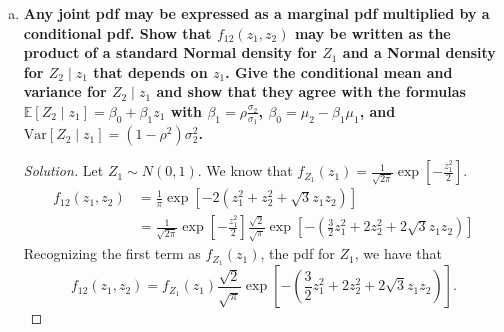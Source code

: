 \documentclass[11pt]{article}
\newenvironment{solution}
  {\renewcommand\qedsymbol{$\blacksquare$}\begin{proof}[Solution]}
  {\end{proof}}
\begin{document}
\begin{enumerate}
\begin{enumerate}[a)]
      \begin{solution}
        Note that 
        \begin{align*}
          f_{12}(z_1, z_2) &= \exp \left[ -\log (\pi ) - 2(z_1^2 + z_2^2 + \sqrt{3}z_1 z_2) \right] \\
          &= \frac{1}{\pi} \exp \left[ - 2(z_1^2 + z_2^2 + \sqrt{3}z_1 z_2) \right].
        \end{align*}

        Rewriting this expression, we have that 
        \begin{align*}
          f_{12}(z_1, z_2) &= \frac{1}{\pi} \exp \left[ - 2(z_1^2 + z_2^2 + \sqrt{3}z_1 z_2) \right] \\
          &= \frac{1}{2\pi \left( \frac{1}{2} \right)}  \exp \left[ -\frac{1}{2\left( \frac{1}{4} \right) }(z_1^2 + z_2^2 - 2\left( -\frac{\sqrt{3}}{2} \right) z_1 z_2) \right].
        \end{align*}

        We recognize this as a bivariate Normal density, with 
        \[
          \boxed{\mu_1 = \mu_2 = 0, \sigma_1 = \sigma_2 = 1, \text{ and } \rho = -\frac{\sqrt{3}}{2}}. \qedhere
        \]
      \end{solution}

      \item \textbf{Any joint pdf may be expressed as a marginal pdf multiplied by a conditional pdf. Show that $f_{12}(z_1, z_2)$ may be written as the product of a standard Normal density for $Z_1$ and a Normal density for $Z_2\mid z_1$ that depends on $z_1$.
      Give the conditional mean and variance for $Z_2 \mid z_1$ and show that they agree with the formulas $\mathbb{E}[Z_2 \mid z_1] = \beta_0 + \beta_1 z_1$ with $\beta_1 = \rho \frac{\sigma_2}{\sigma_1}$, 
      $\beta_0 = \mu_2 - \beta_1 \mu_1$, and $\mathrm{Var} \left[Z_2 \mid z_1 \right] = (1-\rho^2)\sigma_2^2$.}

      \begin{solution}
      Let $Z_1 \sim N(0, 1)$. We know that $f_{Z_1}(z_1) = \frac{1}{\sqrt{2\pi}} \exp \left[ -\frac{z_1^2}{2} \right].$ 
      \begin{align*}
        f_{12}(z_1, z_2) &= \frac{1}{\pi} \exp \left[- 2(z_1^2 + z_2^2 + \sqrt{3}z_1 z_2) \right] \\
        &= \frac{1}{\sqrt{2\pi}} \exp \left[ -\frac{z_1^2}{2} \right] \frac{\sqrt{2}}{\sqrt{\pi}} \exp \left[- \left(\frac{3}{2}z_1^2 + 2z_2^2 + 2\sqrt{3}z_1 z_2\right) \right] 
      \end{align*}
      Recognizing the first term as $f_{Z_1}(z_1)$, the pdf for $Z_1$, we have that
      \[
        f_{12}(z_1, z_2) = f_{Z_1}(z_1) \frac{\sqrt{2}}{\sqrt{\pi}} \exp \left[- \left(\frac{3}{2}z_1^2 + 2z_2^2 + 2\sqrt{3}z_1 z_2\right) \right].
      \]


\end{solution}
\end{enumerate}
\end{enumerate}
\end{document}
